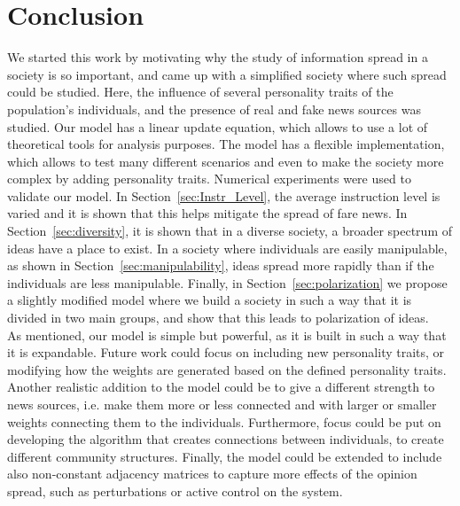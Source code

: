 \section{Conclusion}
We started this work by motivating why the study of information spread in a society is so important, and came up with a simplified society where such spread could be studied. Here, the influence of several personality traits of the population's individuals, and the presence of real and fake news sources was studied. Our model has a linear update equation, which allows to use a lot of theoretical tools for analysis purposes. The model has a flexible implementation, which allows to test many different scenarios and even to make the society more complex by adding personality traits.
Numerical experiments were used to validate our model. In Section~\ref{sec:Instr_Level}, the average instruction level is varied and it is shown that this helps mitigate the spread of fare news. In Section~\ref{sec:diversity}, it is shown that in a diverse society, a broader spectrum of ideas have a place to exist. In a society where individuals are easily manipulable, as shown in Section~\ref{sec:manipulability}, ideas spread more rapidly than if the individuals are less manipulable.
Finally, in Section~\ref{sec:polarization} we propose a slightly modified model where we build a society in such a way that it is divided in two main groups, and show that this leads to polarization of ideas.\\
As mentioned, our model is simple but powerful, as it is built in such a way that it is expandable. Future work could focus on including new personality traits, or modifying how the weights are generated based on the defined personality traits. Another realistic addition to the model could be to give a different strength to news sources, i.e. make them more or less connected and with larger or smaller weights connecting them to the individuals.
Furthermore, focus  could be put on developing the algorithm that creates connections between individuals, to create different community structures. Finally, the model could be extended to include also non-constant adjacency matrices to capture more effects of the opinion spread, such as perturbations or active control on the system. 
 